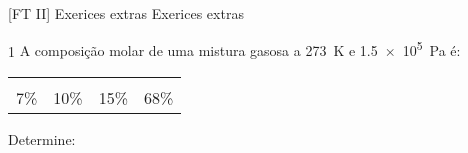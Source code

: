 \documentclass[\mainfilename]{subfiles}
\begin{document}

[FT II]
{Exerices extras} %
{Exerices extras} %

\begin{questionBox}1{ %
    A composição molar de uma mistura gasosa a \qty*{273}{\kelvin} e \qty*{1.5e5}{\Pa} é:
} %
    \begin{center}
        \vspace{1ex}
        \begin{tabular}{*{4}{C}}
            \toprule

                &   
                &   
                &   
                \\  7\%
                &   10\%
                &   15\%
                &   68\%
            
            \\\bottomrule
        \end{tabular}
        \vspace{2ex}
    \end{center}
    Determine:


\end{questionBox}
\end{document}
